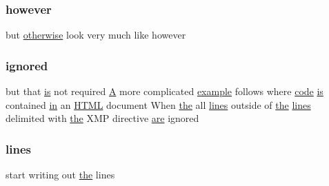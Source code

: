 \subsubsection{\texorpdfstring{however}{however}}
{\footnotesize\ttfamily but \hyperlink{exit_87_8txt_add9358f1f2e831e2906102c98d66905f}{otherwise} look very much like however}

\mbox{\label{ufpp__overview_81_8txt_a41b072d4e414a3fa706019354766d5a8}} 
\subsubsection{\texorpdfstring{ignored}{ignored}}
{\footnotesize\ttfamily but that \hyperlink{intro__blas1_83_8txt_a42a91df93f840595de3019ceb5d1df23}{is} not required \hyperlink{ufpp__overview_81_8txt_a8341271e5f4e3003f6eb1c9547fc9d1a}{A} more complicated \hyperlink{option__stopwatch_83_8txt_a234fb06c9989676e2603991316e7ddc3}{example} follows where \hyperlink{ufpp__overview_81_8txt_a74a0615f2d9c4a398d9126096f8092f8}{code} \hyperlink{intro__blas1_83_8txt_a42a91df93f840595de3019ceb5d1df23}{is} contained \hyperlink{M__journal_83_8txt_afce72651d1eed785a2132bee863b2f38}{in} an \hyperlink{README_8txt_ad2be234454502f9b6337665f9aa3f7aa}{H\+T\+ML} document When \hyperlink{M__stopwatch_83_8txt_a0f266597de2e57eb3aa964927bb30e14}{the} all \hyperlink{ufpp__overview_81_8txt_a38547e77f801e6266edc9bcd56b63a00}{lines} outside of \hyperlink{M__stopwatch_83_8txt_a0f266597de2e57eb3aa964927bb30e14}{the} \hyperlink{ufpp__overview_81_8txt_a38547e77f801e6266edc9bcd56b63a00}{lines} delimited with \hyperlink{M__stopwatch_83_8txt_a0f266597de2e57eb3aa964927bb30e14}{the} X\+MP directive \hyperlink{M__stopwatch_83_8txt_a5040be02b832eba08820289c8a1f81c4}{are} ignored}

\mbox{\label{ufpp__overview_81_8txt_a38547e77f801e6266edc9bcd56b63a00}} 
\subsubsection{\texorpdfstring{lines}{lines}}
{\footnotesize\ttfamily start writing out \hyperlink{M__stopwatch_83_8txt_a0f266597de2e57eb3aa964927bb30e14}{the} lines}

